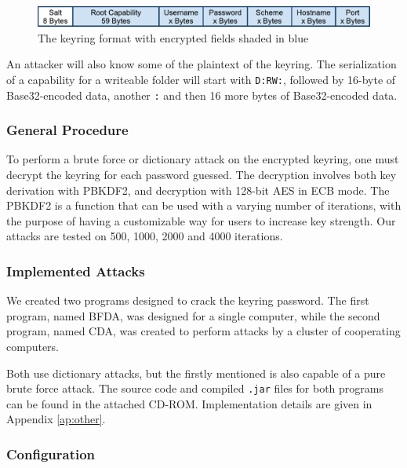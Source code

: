 \documentclass[pdftex,english,10pt,b5paper,twoside]{book}
\begin{document}
\begin{figure}[h!]
    \centering
    \includegraphics[scale=0.6]{KeyringFormat.pdf}
    \caption{The keyring format with encrypted fields shaded in blue}
    \label{fig:KeyringFormat}
\end{figure}

An attacker will also know some of the plaintext of the keyring. The
serialization of a capability for a writeable folder will
start with \texttt{D:RW:}, followed by 16-byte of Base32-encoded data, another
\texttt{:} and then 16 more bytes of Base32-encoded data.

\subsubsection{General Procedure}

To perform a brute force or dictionary attack on the encrypted keyring, one
must decrypt the keyring for each password guessed. The decryption involves
both key derivation with \ac{PBKDF2}, and decryption with 128-bit \ac{AES} in
\ac{ECB} mode. The \ac{PBKDF2} is a function that can be used with a
varying number of iterations, with the purpose of having a customizable way for
users to increase key strength. Our attacks are tested on 500, 1000, 2000 and
4000 iterations.


\subsubsection{Implemented Attacks}

We created two programs designed to crack the keyring password. The first
program, named \acf{BFDA}, was designed for a single computer, while the second
program, named \acf{CDA}, was created to perform attacks by a cluster of
cooperating computers.

Both use dictionary attacks, but the firstly mentioned is also capable of a
pure brute force attack. The source code and compiled \texttt{.jar} files for
both programs can be found in the attached CD-ROM. Implementation details are
given in Appendix \ref{ap:other}.

\subsubsection{Configuration}
\end{document}
